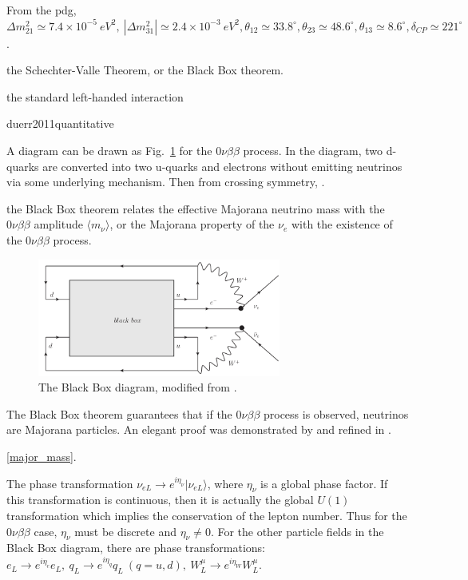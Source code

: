 From the pdg, $\Delta m^2_{21}\simeq 7.4\times 10^{-5}~eV^2,~|\Delta m^2_{31}|\simeq 2.4\times 10^{-3}~eV^2 ,\theta_{12}\simeq 33.8^\circ, \theta_{23}\simeq 48.6^\circ,\theta_{13}\simeq 8.6^\circ, \delta_{CP}\simeq 221^\circ$.

the Schechter-Valle Theorem, or the Black Box theorem.

the standard left-handed interaction


duerr2011quantitative  


A diagram can be drawn as Fig.~\ref{blackbox} for the $0\nu\beta\beta$ process.
In the diagram, two d-quarks are converted into two u-quarks and electrons without emitting neutrinos via some underlying mechanism. Then from crossing symmetry, \cite{akhmedov2014majorana}.

the Black Box theorem relates the effective Majorana neutrino mass with the $0\nu\beta\beta$ amplitude $\langle m_\nu\rangle$, or the Majorana property of the $\nu_e$ with the existence of the $0\nu\beta\beta$ process. 




\begin{figure}[htbp]
	\centering	
	\includegraphics[width=8cm]{blackbox.png}
	\caption{ The Black Box diagram, modified from \cite{schechter1982neutrinoless}.}
	\label{blackbox}
\end{figure}

The Black Box theorem guarantees that if the $0\nu\beta\beta$ process is observed, neutrinos are Majorana particles. An elegant proof was demonstrated by \cite{takasugi1984can} and refined in \cite{duerr2011quantitative,giunti2007fundamentals}. 

\ref{major_mass}.

The phase transformation $\nu_{eL}\to e^{i\eta_{\nu}}|\nu_{eL}\rangle$, where $\eta_\nu$ is a global phase factor.
If this transformation is continuous, then it is actually the global $U(1)$ transformation which implies the conservation of the lepton number. Thus for the $0\nu\beta\beta$ case, $\eta_\nu$ must be discrete and $\eta_\nu\neq 0$. For the other particle fields in the Black Box diagram, there are phase transformations: $e_L\to e^{i\eta_{e}}e_L,~q_L\to e^{i\eta_q}q_L~(q=u,d),~W^\mu_L\to e^{i\eta_W}W_L^\mu$.

